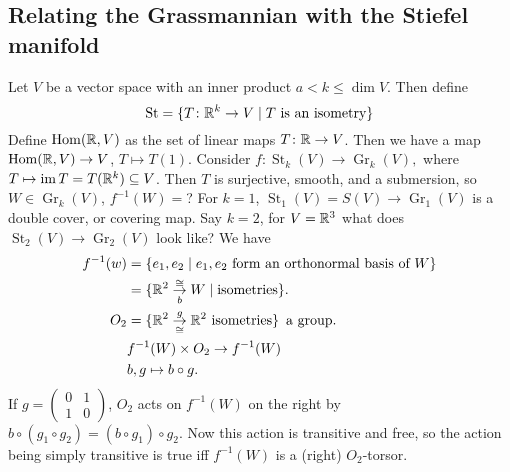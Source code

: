 \subsection{Relating the Grassmannian with the Stiefel manifold}
Let $V$ be a vector space with an inner product $a<k \leq \dim V$. Then define \[
\operatorname{St} = \{T \colon \mathbb{R}^k  \to V \mid T \ \text{is an isometry}  \} 
\]  Define $\operatorname{Hom}(\mathbb{R},V)$ as the set of linear maps $T \colon \mathbb{R} \to V$. Then we have a map $\operatorname{Hom}(\mathbb{R},V) \to V$, $T \mapsto T(1)$. Consider $f \colon \operatorname{St}_k(V) \to \operatorname{Gr}_k(V),$ where $T \mapsto  \operatorname{im} T=T(\mathbb{R}^k) \subseteq V$. Then $T$ is surjective, smooth, and a submersion, so $W \in \operatorname{Gr}_k(V)$, $f^{-1}(W)=$? For $k=1$, $\operatorname{St}_1(V)=S(V) \to \operatorname{Gr}_1(V)$ is a double cover, or covering map. Say $k=2$, for $V=\mathbb{R}^3$ what does $\operatorname{St}_2(V)\to  \operatorname{Gr}_2(V)$ look like? We have 
\begin{align*}
    f^{-1}(w)&= \{e_1,e_2\mid e_1,e_2 \ \text{form an orthonormal basis of} \ W\} \\
    &=\{\R^2 \underset{b}{\overset{\cong}{\to }}W \mid \text{isometries} \} .\\
    O_2&= \{\R^2 \overset{g}{\underset{\cong}{\to } } \R^2 \ \text{isometries}  \} \, \text{ a group.}\\
       &f^{-1}(W) \times O_2 \to f^{-1}(W)\\
       &b,g \mapsto  b \circ g.
\end{align*}If $g=\left( 
\begin{smallmatrix}
    0 & 1 \\ 1 & 0
\end{smallmatrix}\right) $, $O_2$ acts on $f^{-1}(W)$ on the right by $b \circ (g_1 \circ g_2)=(b \circ g_1)\circ g_2$. Now this action is transitive and free, so the action being simply transitive is true iff $f^{-1}(W)$ is a (right) $O_2$-torsor.


